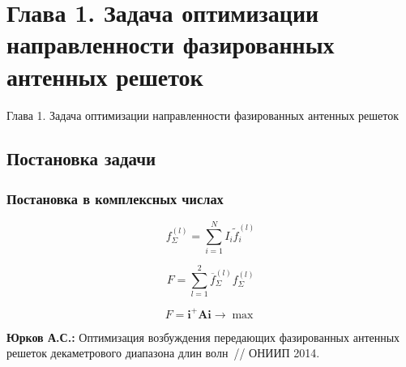 \section{Глава 1. Задача оптимизации направленности фазированных антенных решеток}
\begin{frame}
    \begin{center}
        \Huge
        Глава 1. Задача оптимизации направленности фазированных антенных решеток
    \end{center}
\end{frame}

\subsection{Постановка задачи}
\begin{frame}
    \frametitle{Постановка в комплексных числах}
    \begin{equation}
    f^{(l)}_{\Sigma} = \sum_{i=1}^{N}I_i \tilde{f}_i^{(l)}
    \label{eq:sumfield}
    \end{equation}

     \begin{equation}
        F = \sum_{l=1}^{2}\overline{f}_{\Sigma}^{(l)}f_{\Sigma}^{(l)}
        \label{eq:FPrimary}
    \end{equation}

        \begin{equation}
        F = \textbf{i}^{+}\textbf{Ai} \rightarrow \max
        \label{eq:F}
    \end{equation}

\vspace{2em}
    \textbf{Юрков А.С.:} Оптимизация возбуждения передающих фазированных антенных решеток декаметрового диапазона длин волн~// ОНИИП 2014.
\end{frame}

